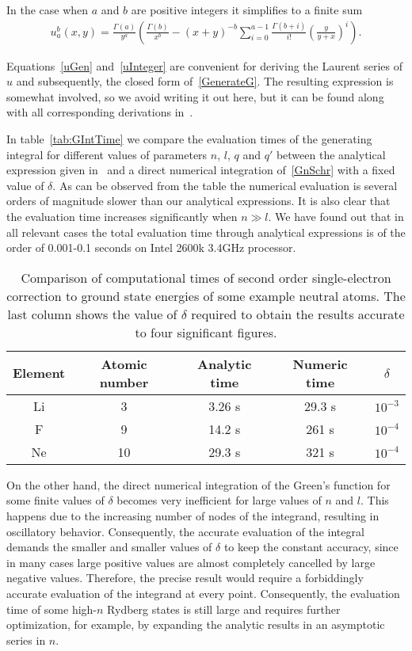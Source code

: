 In the case when $a$ and $b$ are positive integers it simplifies to a finite sum
\begin{align} 
  u_{a}^{b} (x,y) = \frac{\Gamma(a)}{y^a} \left(\frac{\Gamma(b)}{x^b} -
  \left(x+y\right)^{-b} \sum_{i=0}^{a-1} \frac{\Gamma(b+i)}{i!}
  \left(\frac{y}{y+x}\right)^i\right).\label{uInteger}
\end{align}

Equations~\eqref{uGen} and~\eqref{uInteger} are convenient for deriving the Laurent series of $u$ and subsequently, the closed form of~\eqref{GenerateG}. The resulting expression is somewhat involved, so we avoid writing it out here, but it can be found along with all corresponding derivations in~\cite{Dzikowski_2020}.

In table~\ref{tab:GIntTime} we compare the evaluation times of
the generating integral for different values of parameters $n$, $l$,
$q$ and $q'$ between the analytical expression given in~\cite{Dzikowski_2020} and a direct numerical integration of~\eqref{GnSchr} with a fixed value of $\delta$. As can be observed from the table the numerical
evaluation is several orders of magnitude slower than our analytical
expressions. It is also clear that the evaluation time increases significantly when $n \gg l$. We have found out that in all relevant cases the total evaluation time through analytical expressions is of the order of 0.001-0.1 seconds on Intel 2600k 3.4GHz processor.

\begin{table}[b]
\centering
  \begin{tabular}{cc|ccc}
     Element & Atomic number & Analytic time & Numeric time & $\delta$\\
    \hline
    \hline
    Li & 3 & 3.26 s & 29.3 s & $10^{-3}$\\
    F & 9 & 14.2 s & 261 s & $10^{-4}$\\
    Ne & 10 &  29.3 s & 321 s & $10^{-4}$\\
    \hline 
  \end{tabular}
  \caption{Comparison of computational times of second order
    single-electron correction to ground state energies of some
    example neutral atoms. The last column shows the value of $\delta$ required to obtain the
    results accurate to four significant figures.} \label{tab:3}
\end{table}

 On the other hand, the direct numerical
integration of the Green's function for some finite values of $\delta$
becomes very inefficient for large values of $n$ and $l$. This happens due to the increasing number
of nodes of the integrand, resulting in oscillatory
behavior. Consequently, the accurate evaluation of the integral
demands the smaller and smaller values of $\delta$ to keep the
constant accuracy, since in many cases large positive values are
almost completely cancelled by large negative values. Therefore, the
precise result would require a forbiddingly accurate evaluation of the
integrand at every point. Consequently, the evaluation
time of some high-$n$ Rydberg states is still large and requires
further optimization, for example, by expanding the analytic results in an asymptotic series in $n$.

